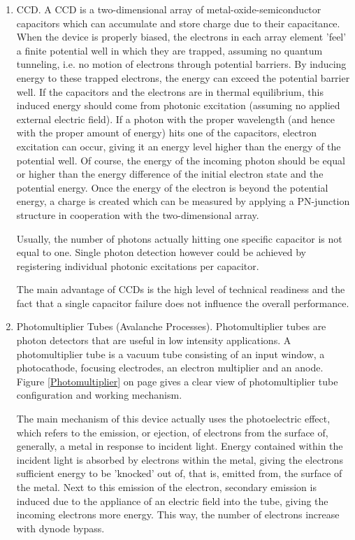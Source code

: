 \begin{enumerate}[i]
	\item \ac{CCD}. A \acs{CCD} is a two-dimensional array of metal-oxide-semiconductor capacitors which can accumulate and store charge due to their capacitance. When the device is properly biased, the electrons in each array element 'feel' a finite potential well in which they are trapped, assuming no quantum tunneling, i.e. no motion of electrons through potential barriers. By inducing energy to these trapped electrons, the energy can exceed the potential barrier well. If the capacitors and the electrons are in thermal equilibrium, this induced energy should come from photonic excitation (assuming no applied external electric field). If a photon with the proper wavelength (and hence with the proper amount of energy) hits one of the capacitors, electron excitation can occur, giving it an energy level higher than the energy of the potential well. Of course, the energy of the incoming photon should be equal or higher than the energy difference of the initial electron state and the potential energy. Once the energy of the electron is beyond the potential energy, a charge is created which can be measured by applying a PN-junction structure in cooperation with the two-dimensional array. 
	
Usually, the number of photons actually hitting one specific capacitor is not equal to one. Single photon detection however could be achieved by registering individual photonic excitations per capacitor. 

The main advantage of \acs{CCD}s is the high level of technical readiness and the fact that a single capacitor failure does not influence the overall performance.

\item Photomultiplier Tubes (Avalanche Processes). Photomultiplier tubes are photon detectors that are useful in low intensity applications. A photomultiplier tube is a vacuum tube consisting of an input window, a photocathode, focusing electrodes, an electron multiplier and an anode.
Figure \ref{Photomultiplier} on page \pageref{Photomultiplier} gives a clear view of photomultiplier tube configuration and working mechanism.

The main mechanism of this device actually uses the photoelectric effect, which refers to the emission, or ejection, of electrons from the surface of, generally, a metal in response to incident light. Energy contained within the incident light is absorbed by electrons within the metal, giving the electrons sufficient energy to be 'knocked' out of, that is, emitted from, the surface of the metal. Next to this emission of the electron, secondary emission is induced due to the appliance of an electric field into the tube, giving the incoming electrons more energy. This way, the number of electrons increase with dynode bypass. 


\end{enumerate}
